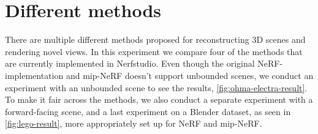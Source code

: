 \section{Different methods}
There are multiple different methods proposed for reconstructing 3D scenes and rendering novel views. In this experiment we compare four of the methods that are currently implemented in Nerfstudio. Even though the original NeRF-implementation and mip-NeRF doesn't support unbounded scenes, we conduct an experiment with an unbounded scene to see the results, \autoref{fig:ohma-electra-result}. To make it fair across the methods, we also conduct a separate experiment with a forward-facing scene, and a last experiment on a Blender dataset, as seen in \autoref{fig:lego-result}, more appropriately set up for NeRF and mip-NeRF.


